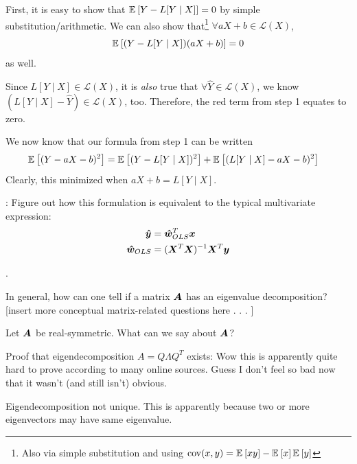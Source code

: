 \documentclass[11pt]{article}
\begin{document}
\begin{compactitem}
\begin{algorithm}
\begin{compactenum}
			\item First, it is easy to show that $\E{Y - L[Y \mid X]} = 0$ by simple substitution/arithmetic. We can also show that\footnote{Also via simple substitution and using $\text{cov}(x, y) = \E{xy} - \E{x}\E{y}$} $\forall aX + b \in \mathcal{L}(X)$, $$\E{(Y - L[Y \mid X])(aX + b)} = 0$$ as well.
			
			\item Since $L[Y \mid X] \in \mathcal{L}(X)$, it is \textit{also} true that $\forall \hat Y \in \mathcal{L}(X)$, we know $(L[Y \mid X] - \hat Y) \in \mathcal{L}(X)$, too. Therefore, the red term from step 1 equates to zero. 
			
			\item We now know that our formula from step 1 can be written
			\begin{align}
				\E{(Y - aX - b)^2}
				&= \E{(Y - L[Y \mid X])^2}  + \E{(L[Y \mid X] - aX - b)^2}
			\end{align}
			Clearly, this minimized when $aX + b = L[Y \mid X]$. 		
		\end{compactenum}
	\end{algorithm}
	: Figure out how this formulation is equivalent to the typical multivariate expression:
	\begin{align}
		\vec{\hat y} 
			&= \vec[OLS]{\hat w}^T \vec x \\
		\vec[OLS]{\hat w}
			&= (\matr{X}^T \matr X)^{-1} \matr{X}^T \vec y
	\end{align}
\end{compactitem}

\myspace
\p {}.
\begin{compactitem}
	
	\item {} In general, how can one tell if a matrix $\matr{A}$ has an eigenvalue decomposition? [insert more conceptual matrix-related questions here . . . ]
	
	\item {} Let $\matr{A}$ be real-symmetric. What can we say about $\matr{A}$?
	\begin{compactitem}
		\item Proof that eigendecomposition $A = Q\Lambda Q^T$ exists: Wow this is apparently quite hard to prove according to many online sources. Guess I don't feel so bad now that it wasn't (and still isn't) obvious. 
		
		\item Eigendecomposition not unique. This is apparently because two or more eigenvectors may have same eigenvalue. 
	\end{compactitem}
\end{compactitem}
\end{document}
